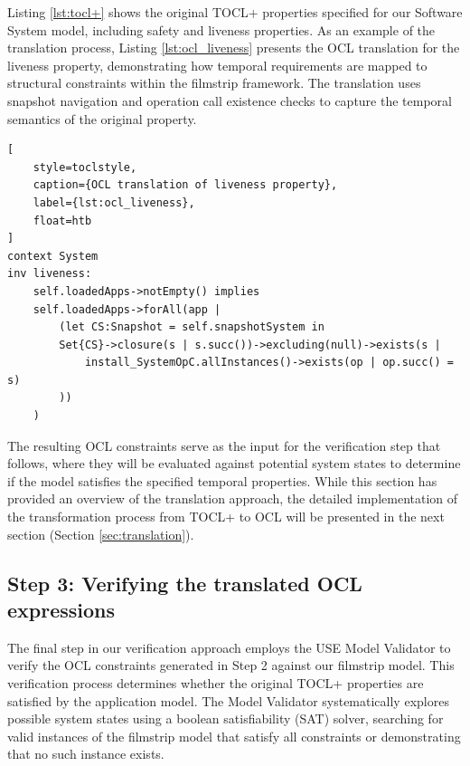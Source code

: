 Listing \ref{lst:tocl+} shows the original TOCL+ properties specified for our 
Software System model, including safety and liveness properties. As an example of 
the translation process, Listing \ref{lst:ocl_liveness} presents the OCL translation 
for the liveness property, demonstrating how temporal requirements are mapped to 
structural constraints within the filmstrip framework. The translation uses snapshot 
navigation and operation call existence checks to capture the temporal semantics of 
the original property.

\begin{lstlisting}[
    style=toclstyle, 
    caption={OCL translation of liveness property}, 
    label={lst:ocl_liveness},
    float=htb
]
context System
inv liveness:
    self.loadedApps->notEmpty() implies
    self.loadedApps->forAll(app |
        (let CS:Snapshot = self.snapshotSystem in 
        Set{CS}->closure(s | s.succ())->excluding(null)->exists(s | 
            install_SystemOpC.allInstances()->exists(op | op.succ() = s)
        ))
    )
\end{lstlisting}

The resulting OCL constraints serve as the input for the verification step that 
follows, where they will be evaluated against potential system states to determine 
if the model satisfies the specified temporal properties. While this section has 
provided an overview of the translation approach, the detailed implementation 
of the transformation process from TOCL+ to OCL will be presented in the next section
(Section \ref{sec:translation}).


\subsection{Step 3: Verifying the translated OCL expressions}

\hspace{1cm} The final step in our verification approach employs the USE Model 
Validator \cite{USE_Validator} to verify the OCL constraints generated in Step 2 
against our filmstrip model. This verification process determines whether the 
original TOCL+ properties are satisfied by the application model. The Model Validator 
systematically explores possible system states using a boolean satisfiability (SAT) 
solver, searching for valid instances of the filmstrip model that satisfy all 
constraints or demonstrating that no such instance exists.

